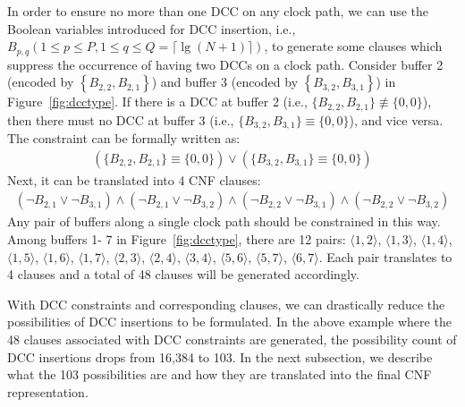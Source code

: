 
In order to ensure no more than one DCC on any clock path, we can use the Boolean variables introduced for DCC insertion, i.e., {\fontsize{9}{10}$B_{p,q} \left(1 \leq p \leq P, 1 \leq q \leq Q = \lceil \lg (N + 1) \rceil \right)$}, to generate some clauses which suppress the occurrence of having two DCCs on a clock path. Consider buffer 2 (encoded by {\fontsize{9}{10}$\left\{B_{2,2}, B_{2,1}\right\}$}) and buffer 3 (encoded by {\fontsize{9}{10}$\left\{B_{3,2}, B_{3,1}\right\}$}) in Figure~\ref{fig:dcctype}. If there is a DCC at buffer 2 (i.e., {\fontsize{9}{10}$\{B_{2,2}, B_{2,1}\} \not\equiv \{0, 0\}$}), then there must no DCC at buffer 3 (i.e., {\fontsize{9}{10}$\{B_{3,2}, B_{3,1}\} \equiv \{0, 0\}$}), and vice versa. The constraint can be formally written as:
{\fontsize{9}{10}
\begin{gather*}
\left(\{B_{2,2}, B_{2,1}\} \equiv \{0, 0\}\right) \lor \left(\{B_{3,2}, B_{3,1}\} \equiv \{0, 0\}\right)
\end{gather*}}
Next, it can be translated into 4 CNF clauses:
{\fontsize{9}{10}
\begin{equation*}
\begin{split}
(\neg B_{2,1}\lor\neg B_{3,1}) \land (\neg B_{2,1}\lor\neg B_{3,2}) \land (\neg B_{2,2}\lor\neg B_{3,1}) \land (\neg B_{2,2}\lor\neg B_{3,2})
\end{split}
\end{equation*}}
Any pair of buffers along a single clock path should be constrained in this way. Among buffers 1- 7 in Figure~\ref{fig:dcctype}, there are 12 pairs: $\langle1, 2\rangle$, $\langle1, 3\rangle$, $\langle1, 4\rangle$, $\langle1, 5\rangle$, $\langle1, 6\rangle$, $\langle1, 7\rangle$, $\langle2, 3\rangle$, $\langle2, 4\rangle$, $\langle3, 4\rangle$, $\langle5, 6\rangle$, $\langle5, 7\rangle$, $\langle6, 7\rangle$. Each pair translates to 4 clauses and a total of 48 clauses will be generated accordingly.

With DCC constraints and corresponding clauses, we can drastically reduce the possibilities of DCC insertions to be formulated. In the above example where the 48 clauses associated with DCC constraints are generated, the possibility count of DCC insertions drops from 16,384 to 103. In the next subsection, we describe what the 103 possibilities are and how they are translated into the final CNF representation.


